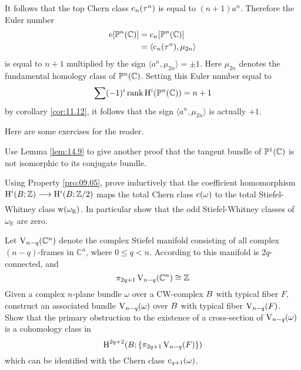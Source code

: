\documentclass[../main]{subfiles}
\begin{document}
\begin{remark*} It follows that the top Chern class $\operatorname{c}_{n}(\tau_{}^n)$ is equal to $(n+1) a^{n}$. Therefore the Euler number
\[
\begin{aligned}
\operatorname{e}[\mathbb{P}^{n}(\mathbb{C})] &=\operatorname{c}_{n}[\mathbb{P}^{n}(\mathbb{C})] \\
&=\langle\operatorname{c}_{n}(\tau_{}^n), \mu_{2 n}\rangle
\end{aligned}
\]
is equal to $n+1$ multiplied by the sign $\langle a^{n}, \mu_{2 n}\rangle=\pm 1$. Here $\mu_{2 n}$ denotes the fundamental homology class of $\mathbb{P}^{n}(\mathbb{C})$. Setting this Euler number equal to
\[
\sum(-1)^{i} \operatorname{rank} \operatorname{H}^{i}(\mathbb{P}^{n}(\mathbb{C}))=n+1
\]
by corollary \ref{cor:11.12}, it follows that the sign $\langle a^{n}, \mu_{2 n}\rangle$ is actually $+1$. \end{remark*}

Here are some exercises for the reader.

\begin{problem}\label{prob:14.A}Use Lemma \ref{lem:14.9} to give another proof that the tangent bundle of $\mathbb{P}^{1}(\mathbb{C})$ is not isomorphic to its conjugate bundle.
\end{problem}

\begin{problem}\label{prob:14.B} Using Property \ref{pro:09.05}, prove inductively that the coefficient homomorphism $\homology^{i}(\base ; \mathbb{Z}) \varrightarrow{} \homology^{i}(\base ; \mathbb{Z} / 2)$ maps the total Chern class $\operatorname{c}(\omega)$ to the total Stiefel-Whitney class $\operatorname{w}(\omega_{\mathbb{R}})$. In particular show that the odd Stiefel-Whitney classes of $\omega_{\mathbb{R}}$ are zero.

\end{problem} 

\begin{problem}\label{prob:14.C} Let $\operatorname{V}_{n-q}(\mathbb{C}^{n})$ denote the complex Stiefel manifold consisting of all complex $(n-q)$-frames in $\mathbb{C}^{n}$, where $0 \leq q<n$. According to \cite[$\S$25.7]{steenrod1951} this manifold is $2 q$-connected, and
\[
\pi_{2 q+1} \operatorname{V}_{n-q}(\mathbb{C}^{n}) \cong \mathbb{Z}
\]
Given a complex $n$-plane bundle $\omega$ over a CW-complex $B$ with typical fiber $F$, construct an associated bundle $\operatorname{V}_{n-q}(\omega)$ over $B$ with typical fiber $\operatorname{V}_{n-q}(F)$. Show that the primary obstruction to the existence of a cross-section of $\operatorname{V}_{n-q}(\omega)$ is a cohomology class in
\[
\operatorname{H}^{2 q+2}(B ;\{\pi_{2 q+1} \operatorname{V}_{n-q}(F)\})
\]
which can be identified with the Chern class $\operatorname{c}_{q+1}(\omega)$.
\end{problem}
\end{document}
